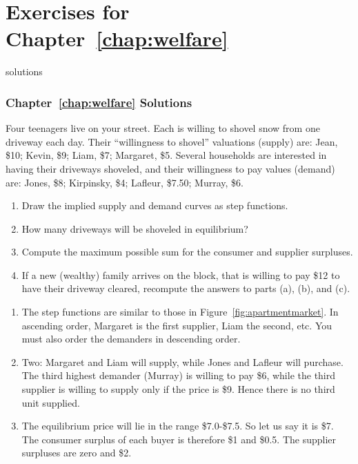 \newpage
\section*{Exercises for Chapter~\ref{chap:welfare}}

\begin{Filesave}{solutions}
\subsubsection*{Chapter~\ref{chap:welfare} Solutions}
\end{Filesave}

\begin{enumialphparenastyle}

\begin{econex}\label{ex:ch5ex1}
Four teenagers live on your street. Each is willing to shovel snow from one driveway each day. Their ``willingness to shovel'' valuations (supply) are: Jean, \$10; Kevin, \$9; Liam, \$7; Margaret, \$5. Several households are interested in having their driveways shoveled, and their willingness to pay values (demand) are: Jones, \$8; Kirpinsky, \$4; Lafleur, \$7.50; Murray, \$6.
\begin{enumerate}
\item	Draw the implied supply and demand curves as step functions.
\item	How many driveways will be shoveled in equilibrium?
\item	Compute the maximum possible sum for the consumer and supplier surpluses.
\item	If a new (wealthy) family arrives on the block, that is willing to pay \$12 to have their driveway cleared, recompute the answers to parts (a), (b), and (c).
\end{enumerate}
\begin{econsolution}
\begin{enumerate}
\item	The step functions are similar to those in Figure~\ref{fig:apartmentmarket}. In ascending order, Margaret is the first supplier, Liam the second, etc. You must also order the demanders in descending order.
\item	Two: Margaret and Liam will supply, while Jones and Lafleur will purchase. The third highest demander (Murray) is willing to pay \$6, while the third supplier is willing to supply only if the price is \$9. Hence there is no third unit supplied.
\item	The equilibrium price will lie in the range \$7.0-\$7.5. So	let us say it is \$7. The consumer surplus of each buyer is therefore \$1 and \$0.5. The supplier surpluses are zero and \$2.

\end{enumerate}
\end{econsolution}
\end{econex}
\end{enumialphparenastyle}
